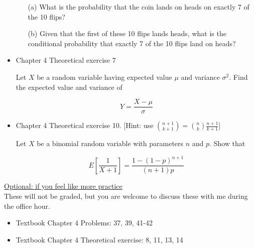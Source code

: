 \documentclass[11pt]{article}
\begin{document}
\begin{itemize}
    \begin{itemize}
    \item[(a)] What is the probability that the coin lands on heads on exactly 7 of the 10 flips?
    
    \item[(b)] Given that the first of these 10 flips lands heads, what is the conditional probability that exactly 7 of the 10 flips land on heads?
    \end{itemize}


    \item
    Chapter 4 Theoretical exercise 7
    
    Let $X$ be a random variable having expected value $\mu$ and variance $\sigma^2$. Find the expected value and variance of
    
    $$
    Y  = \frac{X - \mu}{\sigma}
    $$

 \item
    Chapter 4 Theoretical exercise 10. [Hint: use ${n + 1 \choose k + 1} = {n  \choose k } \frac{n + 1}{ k + 1}$]
    
    Let $X$ be a binomial random variable with parameters $n$ and $p$. Show that
    
    $$
    E\left[\frac{1}{X+1}\right] = \frac{1 - (1-p)^{n+1}}{(n+1)p}
    $$


\end{itemize}


\vspace{12pt}

\underline{Optional: if you feel like more practice}\\
These will not be graded, but you are welcome to discuss these with me during the office hour.

\begin{itemize}


\item Textbook  Chapter 4 Problems:  37, 39, 41-42
\item Textbook  Chapter 4 Theoretical exercise: 8, 11, 13, 14

\end{itemize}
\end{document}
